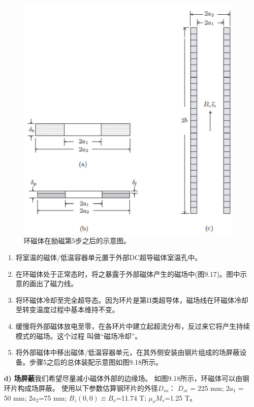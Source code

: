 \begin{figure}
	\centering
	\includegraphics[scale=0.5]{chpt9/figs/fig9.16.eps}
	\caption{环磁体在励磁第5步之后的示意图。}
\end{figure}

\begin{enumerate}
	\item 将室温的磁体/低温容器单元置于外部DC超导磁体室温孔中。
	\item 在环磁体处于正常态时，将之暴露于外部磁体产生的磁场中(图9.17)。图中示意的画出了磁力线。
	\item 将环磁体冷却至完全超导态。因为环片是第II类超导体，磁场线在环磁体冷却至转变温度过程中基本维持不变。
	\item 缓慢将外部磁体放电至零，在各环片中建立起超流分布，反过来它将产生持续模式的磁场。这个过程
	叫做“磁场冷却”。
	\item 将外部磁体中移出磁体/低温容器单元，在其外侧安装由钢片组成的场屏蔽设备。步骤5之后的总体装配示意图如图9.18所示。	
\end{enumerate}

\textbf{d) 场屏蔽}\qquad 我们希望尽量减小磁体外部的边缘场。
如图9.18所示，环磁体可以由钢环片构成场屏蔽。
使用以下参数估算钢环片的外径$D_{so}$：
$D_{si}$ = 225 mm; $2a_1$ = 50 mm;
$2a_2$=75 mm; $B_z(0, 0)\equiv B_o$=11.74 T; $\mu_o M_s$=1.25 T。

